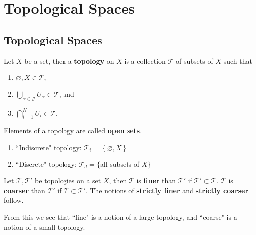 \documentclass[twoside,10pt]{report}
\begin{document}
\tableofcontents



\chapter{Topological Spaces}


\section{Topological Spaces}

\begin{defn}
	Let $X$ be a set, then a \textbf{topology} on $X$ is a collection $\mathcal{T}$ of subsets of $X$ such that
	\begin{enumerate}
		\item $\varnothing, X \in \mathcal{T}$,
		\item $\bigcup_{\alpha\in \mathcal{J}}U_\alpha \in \mathcal{T}$, and
		\item $\bigcap_{i=1}^N U_i \in \mathcal{T}$.
	\end{enumerate}
	Elements of a topology are called \textbf{open sets}.
\end{defn}

\begin{ex}
\begin{enumerate}
	\item ``Indiscrete" topology: $\mathcal{T}_i = \left\{ \varnothing, X \right\}$ 
	\item ``Discrete" topology: $\mathcal{T}_d =\{$all subsets of $X\}$
\end{enumerate}
\end{ex}

\begin{defn}
	Let $\mathcal{T},\mathcal{T}'$ be topologies on a set $X$, then $\mathcal{T}$ is \textbf{finer} than $\mathcal{T}'$ if $\mathcal{T}' \subset \mathcal{T}$. $\mathcal{T}$ is \textbf{coarser} than $\mathcal{T}'$ if $\mathcal{T} \subset \mathcal{T}'$. The notions of \textbf{strictly finer} and \textbf{strictly coarser} follow.
\end{defn}

From this we see that ``fine" is a notion of a large topology, and ``coarse" is a notion of a small topology.
\end{document}
